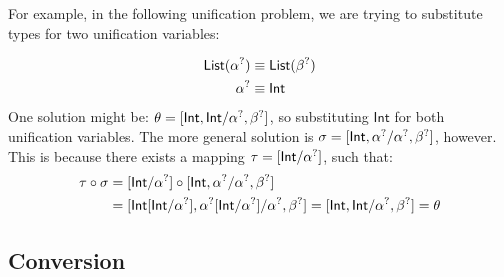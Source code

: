 \documentclass[twoside,12pt,a4paper]{article}
\begin{document}
For example, in the following unification problem, we are trying to substitute types for two unification variables:
\begin{example}
    \begin{align*}
        \mathsf{List}(\alpha^?) &\equiv \mathsf{List}(\beta^?)\\
        \alpha^? &\equiv \mathsf{Int}
    \end{align*}
    One solution might be: $\theta = [\mathsf{Int, Int / \alpha^?, \beta^?}]$, 
so substituting $\mathsf{Int}$ for both unification variables.
The more general solution is $\sigma = [\mathsf{Int,\alpha^? / \alpha^?, \beta^?}]$, however.
This is because there exists a mapping $\tau = [\mathsf{Int / \alpha^?}]$, such that:
\begin{align*}
    \tau \circ \sigma &= [\mathsf{Int / \alpha^?}]\circ[\mathsf{Int,\alpha^? / \alpha^?, \beta^?}] \\
    &= [\mathsf{Int[Int/\alpha^?], \alpha^?[Int/\alpha^?] / \alpha^?, \beta^?]= [Int, Int / \alpha^?, \beta^?]= \theta}
\end{align*}    
\end{example}

\subsection{Conversion}
\end{document}
